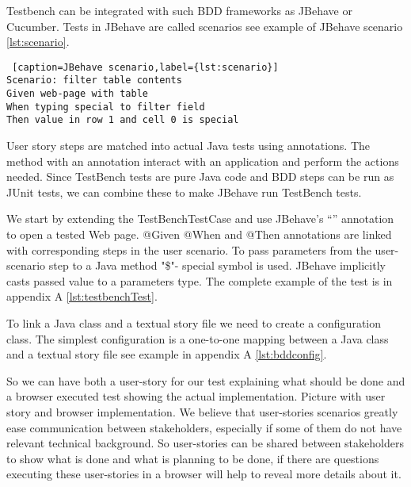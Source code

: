 Testbench can be integrated with such BDD frameworks as JBehave or Cucumber.
Tests in JBehave are called scenarios see example of JBehave scenario
\ref{lst:scenario}.

 \lstset{style=console}
  \begin{lstlisting} [caption=JBehave scenario,label={lst:scenario}]
Scenario: filter table contents
Given web-page with table
When typing special to filter field
Then value in row 1 and cell 0 is special
  \end{lstlisting}
User story steps are matched into actual Java tests using annotations. 
The method with an annotation interact with an application and perform the actions needed.
Since TestBench tests are pure Java code and BDD steps can be run as JUnit tests, we can combine these to make
JBehave run TestBench tests.

We start by extending the TestBenchTestCase  and use JBehave's ``\@BeforeScenario''
annotation to open a tested Web page.  @Given @When and @Then annotations are
linked with corresponding steps in the user scenario.
To pass parameters from the user-scenario step to a Java method "\$"- special symbol is used.
JBehave implicitly casts passed value to a parameters type. The complete example
of the test is in appendix A \ref{lst:testbenchTest}.

To link a Java class and a textual story file we need to create a configuration class.
The simplest configuration is a one-to-one mapping between a Java class and a textual story file
see example in appendix A \ref{lst:bddconfig}. 

So we can have both a user-story for our test explaining what should be done and a browser executed
test showing the actual implementation. Picture with user story and browser implementation. We believe that user-stories 
scenarios greatly ease communication between stakeholders, 
especially if some of them do not have relevant technical background.
So user-stories can be shared between stakeholders to show what is done and what
is planning to be done, if there are questions 
executing these user-stories in a browser will help to reveal more details about it. 
   

    
